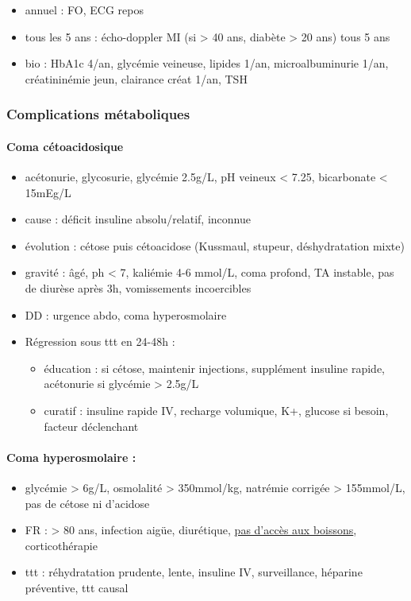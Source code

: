 \documentclass{book}
\begin{document}
\begin{tcolorbox}
\begin{itemize}
 \item annuel : FO, ECG repos 
 \item tous les 5 ans : écho-doppler MI (si > 40 ans, diabète > 20 ans) tous 5 ans
 \item bio : HbA1c 4/an, glycémie veineuse, lipides 1/an, microalbuminurie 1/an,
   créatininémie jeun, clairance créat 1/an, TSH
\end{itemize}
\end{tcolorbox}

\subsubsection{Complications métaboliques}
\label{sec:org14a878f}
\paragraph{Coma cétoacidosique}
\label{sec:org9efa5d0}
\begin{itemize}
\item acétonurie, glycosurie, glycémie 2.5g/L, pH veineux < 7.25, bicarbonate <
15mEg/L
\item cause : déficit insuline absolu/relatif, inconnue
\item évolution : cétose puis cétoacidose (Kussmaul, stupeur, déshydratation mixte)
\item gravité : âgé, ph < 7, kaliémie 4-6 mmol/L, coma profond, TA instable, pas de
diurèse après 3h, vomissements incoercibles
\item DD : urgence abdo, coma hyperosmolaire
\item Régression sous ttt en 24-48h : 
\begin{itemize}
\item éducation : si cétose, maintenir injections, supplément insuline rapide,
acétonurie si glycémie > 2.5g/L
\item curatif : insuline rapide IV, recharge volumique, K+, glucose
si besoin, facteur déclenchant
\end{itemize}
\end{itemize}

\paragraph{Coma hyperosmolaire :}
\label{sec:org83c4ee6}
\begin{itemize}
\item glycémie > 6g/L, osmolalité > 350mmol/kg, natrémie corrigée > 155mmol/L, pas
de cétose ni d'acidose
\item FR : > 80 ans, infection aigüe, diurétique, \uline{pas d'accès aux boissons}, corticothérapie
\item ttt : réhydratation prudente, lente, insuline IV, surveillance, héparine
préventive, ttt causal
\end{itemize}
\end{document}
